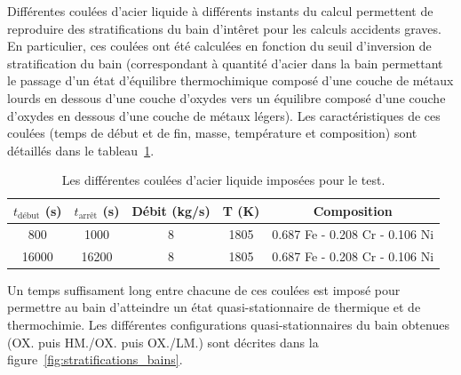 Différentes coulées d'acier liquide à différents instants du calcul permettent de reproduire des stratifications du bain d'intêret pour les calculs accidents graves. En particulier, ces coulées ont été calculées en fonction du seuil d'inversion de stratification du bain (correspondant à quantité d'acier dans la bain permettant le passage d'un état d'équilibre thermochimique composé d'une couche de métaux lourds en dessous d'une couche d'oxydes vers un équilibre composé d'une couche d'oxydes en dessous d'une couche de métaux légers). Les caractéristiques de ces coulées (temps de début et de fin, masse, température et composition) sont détaillés dans le tableau~\ref{tab:coulees_acier}. 
\begin{table}
	\centering
	\begin{tabular}{ccccc} 
	\hline
	$t_{\text{début}}$ (s) &  $t_{\text{arrêt}}$ (s) & Débit (kg/s) & T (K) & Composition\\
	\hline
	800 & 1000 & 8 & 1805 & 0.687 Fe - 0.208 Cr - 0.106 Ni\\
	16000 & 16200 & 8 & 1805 & 0.687 Fe - 0.208 Cr - 0.106 Ni\\
	\hline
	\end{tabular}	
	\caption{Les différentes coulées d'acier liquide imposées pour le test.} 
	\label{tab:coulees_acier}
\end{table}
Un temps suffisament long entre chacune de ces coulées est imposé pour permettre au bain d'atteindre un état quasi-stationnaire de thermique et de thermochimie. Les différentes configurations quasi-stationnaires du bain obtenues (OX. puis HM./OX. puis OX./LM.) sont décrites dans la figure~\ref{fig:stratifications_bains}.
